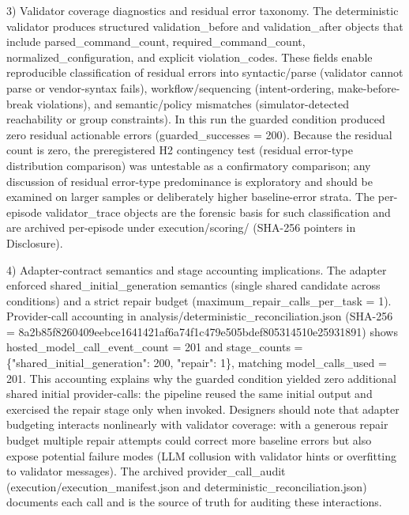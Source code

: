 \documentclass[conference]{IEEEtran}
\begin{document}
3) Validator coverage diagnostics and residual error taxonomy. The deterministic validator produces structured validation\_before and validation\_after objects that include parsed\_command\_count, required\_command\_count, normalized\_configuration, and explicit violation\_codes. These fields enable reproducible classification of residual errors into syntactic/parse (validator cannot parse or vendor-syntax fails), workflow/sequencing (intent-ordering, make-before-break violations), and semantic/policy mismatches (simulator-detected reachability or group constraints). In this run the guarded condition produced zero residual actionable errors (guarded\_successes = 200). Because the residual count is zero, the preregistered H2 contingency test (residual error-type distribution comparison) was untestable as a confirmatory comparison; any discussion of residual error-type predominance is exploratory and should be examined on larger samples or deliberately higher baseline-error strata. The per-episode validator\_trace objects are the forensic basis for such classification and are archived per-episode under execution/scoring/ (SHA-256 pointers in Disclosure).

4) Adapter-contract semantics and stage accounting implications. The adapter enforced shared\_initial\_generation semantics (single shared candidate across conditions) and a strict repair budget (maximum\_repair\_calls\_per\_task = 1). Provider-call accounting in analysis/deterministic\_reconciliation.json (SHA-256 = 8a2b85f8260409eebce1641421af6a74f1c479e505bdef805314510e25931891) shows hosted\_model\_call\_event\_count = 201 and stage\_counts = \{"shared\_initial\_generation": 200, "repair": 1\}, matching model\_calls\_used = 201. This accounting explains why the guarded condition yielded zero additional shared initial provider-calls: the pipeline reused the same initial output and exercised the repair stage only when invoked. Designers should note that adapter budgeting interacts nonlinearly with validator coverage: with a generous repair budget multiple repair attempts could correct more baseline errors but also expose potential failure modes (LLM collusion with validator hints or overfitting to validator messages). The archived provider\_call\_audit (execution/execution\_manifest.json and deterministic\_reconciliation.json) documents each call and is the source of truth for auditing these interactions.
\end{document}
